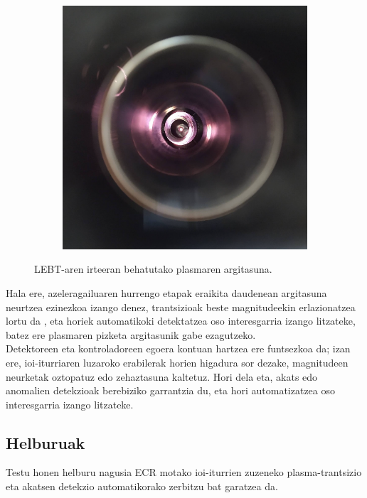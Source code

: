 \documentclass[12pt]{article}
\numberwithin{figure}{section}
\numberwithin{equation}{section}
\begin{document}
\begin{figure}[h]
\begin{subfigure}[b]{0.38\textwidth}
        \includegraphics[width=\linewidth]{1 - Sarrera/plasma2.png}
    \end{subfigure}
    \caption{LEBT-aren irteeran behatutako plasmaren argitasuna.}
    \label{fig:plasma_pictures}
\end{figure}

Hala ere, azeleragailuaren hurrengo etapak eraikita daudenean argitasuna neurtzea ezinezkoa izango denez, trantsizioak beste magnitudeekin erlazionatzea lortu da \cite{fernandez_rua_clasificacion_2024}, eta horiek automatikoki detektatzea oso interesgarria izango litzateke, batez ere plasmaren pizketa argitasunik gabe ezagutzeko.\\

Detektoreen eta kontroladoreen egoera kontuan hartzea ere funtsezkoa da; izan ere, ioi-iturriaren luzaroko erabilerak horien higadura sor dezake, magnitudeen neurketak oztopatuz edo zehaztasuna kaltetuz. Hori dela eta, akats edo anomalien detekzioak berebiziko garrantzia du, eta hori automatizatzea oso interesgarria izango litzateke.

\subsection{Helburuak}
Testu honen helburu nagusia ECR motako ioi-iturrien zuzeneko plasma\hyp{}trantsizio eta akatsen detekzio automatikorako zerbitzu bat garatzea da.\\
\end{document}
